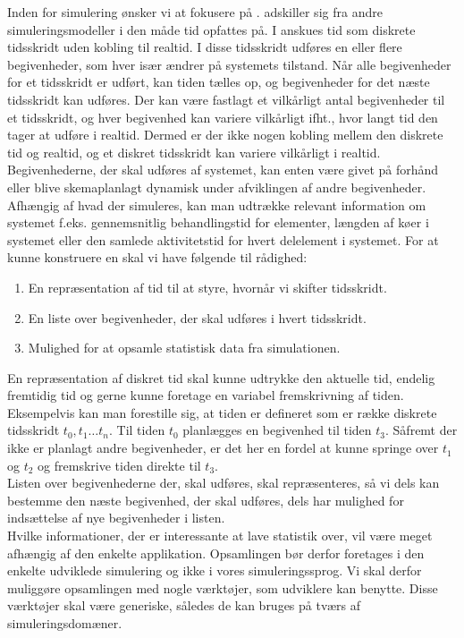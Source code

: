 Inden for simulering ønsker vi at fokusere på \des. \des adskiller sig fra andre simuleringsmodeller i den måde tid opfattes på. I \des anskues tid som diskrete tidsskridt uden kobling til realtid. I disse tidsskridt udføres en eller flere begivenheder, som hver især ændrer på systemets tilstand. Når alle begivenheder for et tidsskridt er udført, kan tiden tælles op, og begivenheder for det næste tidsskridt kan udføres. Der kan være fastlagt et vilkårligt antal begivenheder til et tidsskridt, og hver begivenhed kan variere vilkårligt ifht., hvor langt tid den tager at udføre i realtid. Dermed er der ikke nogen kobling mellem den diskrete tid og realtid, og et diskret tidsskridt kan variere vilkårligt i realtid. Begivenhederne, der skal udføres af systemet, kan enten være givet på forhånd eller blive skemaplanlagt dynamisk under afviklingen af andre begivenheder. 
Afhængig af hvad der simuleres, kan man udtrække relevant information om systemet f.eks. gennemsnitlig behandlingstid for elementer, længden af køer i systemet eller den samlede aktivitetstid for hvert delelement i systemet.
For at kunne konstruere en \des skal vi have følgende til rådighed:
\begin{enumerate}
\tightlist 
\item En repræsentation af tid til at styre, hvornår vi skifter tidsskridt.
\item En liste over begivenheder, der skal udføres i hvert tidsskridt.
\item Mulighed for at opsamle statistisk data fra simulationen. 
\end{enumerate}
En repræsentation af diskret tid skal kunne udtrykke den aktuelle tid, endelig fremtidig tid og gerne kunne foretage en variabel fremskrivning af tiden. Eksempelvis kan man forestille sig, at tiden er defineret som er række diskrete tidsskridt $t_0, t_1 \ldots t_n$. Til tiden $t_{0}$ planlægges en begivenhed til tiden $t_{3}$. Såfremt der ikke er planlagt andre begivenheder, er det her en fordel at kunne springe over $t_{1}$ og $t_{2}$ og fremskrive tiden direkte til $t_{3}$. \\  
Listen over begivenhederne der, skal udføres, skal repræsenteres, så vi dels kan bestemme den næste begivenhed, der skal udføres, dels har mulighed for indsættelse af nye begivenheder i listen. \\
Hvilke informationer, der er interessante at lave statistik over, vil være meget afhængig af den enkelte applikation. Opsamlingen bør derfor foretages i den enkelte udviklede simulering og ikke i vores simuleringssprog. Vi skal derfor muliggøre opsamlingen med nogle værktøjer, som udviklere kan benytte. Disse værktøjer skal være generiske, således de kan bruges på tværs af simuleringsdomæner. 


